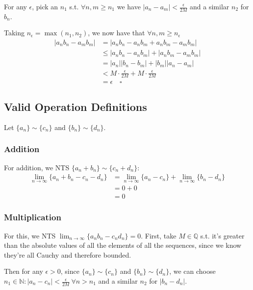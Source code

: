 \documentclass[12pt]{article}
\newcommand{\N}{\mathbb{N}}
\newcommand{\Q}{\mathbb{Q}}
\begin{document}
For any $\epsilon$, pick an $n_1$ s.t. $\forall n, m \ge n_1$
we have $|a_n-a_m| < \frac{\epsilon}{2M}$ and a similar $n_2$ for $b_n$.

Taking $n_\epsilon = \max(n_1, n_2)$,
we now have that $\forall n, m \ge n_\epsilon$
\begin{align*}
  |a_nb_n - a_mb_m|
   & = |a_nb_n - a_nb_m + a_nb_m - a_mb_m|                       \\
   & \le |a_nb_n - a_nb_m| + |a_nb_m - a_mb_m|                   \\
   & = |a_n||b_n - b_m| + |b_m||a_n - a_m|                       \\
   & < M \cdot \frac{\epsilon}{2M} + M \cdot \frac{\epsilon}{2M} \\
   & = \epsilon\quad\square
\end{align*}

\subsection{Valid Operation Definitions}

Let $\{a_n\} \sim \{c_n\}$ and $\{b_n\} \sim \{d_n\}$.

\subsubsection{Addition}

For addition, we NTS $\{a_n + b_n\} \sim \{c_n + d_n\}$:
\begin{align*}
  \lim_{n \to \infty} \{a_n+b_n-c_n-d_n\}
   & = \lim_{n \to \infty} \{a_n-c_n\} + \lim_{n \to \infty} \{b_n-d_n\} \\
   & = 0+0                                                               \\
   & = 0
\end{align*}

\subsubsection{Multiplication}

For this, we NTS $\lim_{n \to \infty} \{a_nb_n-c_nd_n\} = 0$.
First, take $M \in \Q$ s.t. it's greater than the absolute values of all the elements of all the sequences,
since we know they're all Cauchy and therefore bounded.

Then for any $\epsilon > 0$, since $\{a_n\} \sim \{c_n\}$ and $\{b_n\} \sim \{d_n\}$,
we can choose $n_1 \in \N: |a_n-c_n| < \frac{\epsilon}{2M}\ \forall n > n_1$
and a similar $n_2$ for $|b_n-d_n|$.
\end{document}
